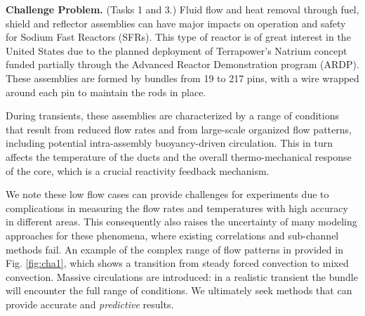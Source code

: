 \noindent \textbf{Challenge Problem.} (Tasks 1 and 3.)
Fluid flow and heat removal through fuel, shield and reflector assemblies  can
have major impacts on operation and safety for Sodium Fast Reactors (SFRs).
This type of reactor is of great interest in the United States due to the
planned  deployment of Terrapower's Natrium concept funded partially through
the Advanced Reactor Demonstration program (ARDP). These assemblies are formed
by bundles from 19 to 217 pins, with a wire wrapped around each pin to maintain
the rods in place.

During transients, these assemblies are characterized by a range of conditions
that result from reduced flow rates and from large-scale organized flow
patterns, including potential intra-assembly buoyancy-driven circulation. This
in turn affects the temperature of the ducts and the overall thermo-mechanical
response of the core, which is a crucial reactivity feedback mechanism.

We note these low flow cases can provide challenges for experiments due to
complications in measuring the flow rates and temperatures with high accuracy
in different areas. This consequently also raises the uncertainty of many
modeling approaches for these phenomena, where existing correlations and
sub-channel methods fail. An example of the complex range of flow patterns in
provided in Fig. \ref{fig:cha1}, which shows a transition from steady forced
convection to mixed convection.  Massive circulations are introduced: in a
realistic transient the bundle will encounter the full range of conditions. We
ultimately seek methods that can provide accurate and \textit{predictive}
results.
